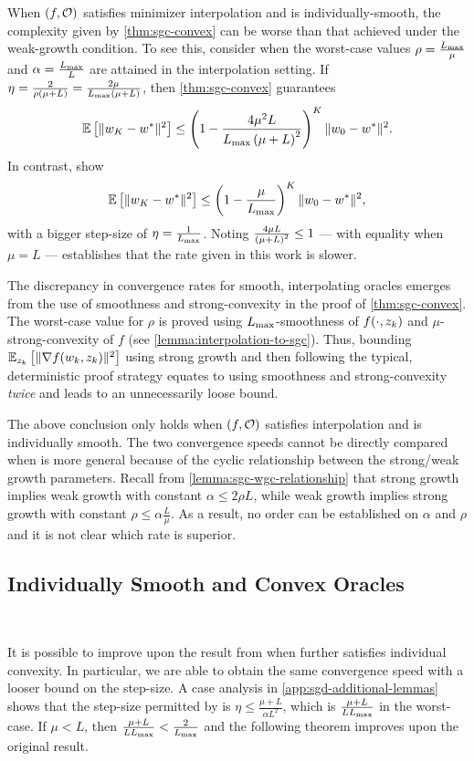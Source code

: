 When \( \rbr{f, \oracle{}} \) satisfies minimizer interpolation and \oracle{} is individually-smooth, the complexity given by \autoref{thm:sgc-convex} can be worse than that achieved under the weak-growth condition.
To see this, consider when the worst-case values \( \sgc = \frac{\Lmax}{\mu} \) and \( \wgc = \frac{\Lmax}{L} \) are attained in the interpolation setting. 
If \( \eta = \frac{2}{\sgc \rbr{\mu + L}} = \frac{2 \mu}{\Lmax\rbr{\mu + L}} \), then \autoref{thm:sgc-convex} guarantees  
\[ \E\sbr{\norm{\w_{K} - \wopt}^2} \leq \rbr{1 - \frac{4 \mu^2 L }{\Lmax \rbr{\mu + L}^2}}^K \norm{\w_0 - \wopt}^2. \]
In contrast, \citet[Theorem 5]{vaswani2019fast} show 
\[ \E\sbr{\norm{\w_{K} - \wopt}^2} \leq \rbr{1 - \frac{\mu}{\Lmax}}^K \norm{\w_0 - \wopt}^2, \]
with a bigger step-size of \( \eta = \frac{1}{\Lmax} \).
Noting \( \frac{4 \mu L}{\rbr{\mu + L}^2} \leq 1 \) --- with equality when \( \mu = L \) --- establishes that the rate given in this work is slower.

The discrepancy in convergence rates for smooth, interpolating oracles emerges from the use of smoothness and strong-convexity in the proof of \autoref{thm:sgc-convex}.
The worst-case value for \( \rho \) is proved using \( \Lmax \)-smoothness of \( f(\cdot, \zk) \) and \( \mu \)-strong-convexity of \( f \) (see \autoref{lemma:interpolation-to-sgc}).
Thus, bounding \( \Ek\sbr{\norm{\grad(\wk, \zk)}^2} \) using strong growth and then following the typical, deterministic proof strategy equates to using smoothness and strong-convexity \emph{twice} and leads to an unnecessarily loose bound.

The above conclusion only holds when \( \rbr{f, \oracle} \) satisfies interpolation and \oracle{} is individually smooth. 
The two convergence speeds cannot be directly compared when \oracle{} is more general because of the cyclic relationship between the strong/weak growth parameters. 
Recall from \autoref{lemma:sgc-wgc-relationship} that strong growth implies weak growth with constant \( \alpha \leq 2 \rho L \), while weak growth implies strong growth with constant \( \rho \leq \alpha \frac{L}{\mu} \).
As a result, no order can be established on \( \alpha \) and \( \rho \) and it is not clear which rate is superior.

\subsection{Individually Smooth and Convex Oracles}~\label{sec:sgd-sgc-ind-convex}

It is possible to improve upon the result from \citet{vaswani2019fast} when \oracle{} further satisfies individual convexity.
In particular, we are able to obtain the same convergence speed with a looser bound on the step-size.
A case analysis in \autoref{app:sgd-additional-lemmas} shows that the step-size permitted by \citet[Theorem 5]{vaswani2019fast} is \( \eta \leq \frac{\mu + L}{\alpha L^2} \), which is \( \frac{\mu + L}{L \Lmax}\) in the worst-case.
If \( \mu < L \), then \( \frac{\mu + L}{L \Lmax} < \frac{2}{\Lmax} \) and the following theorem improves upon the original result. 

